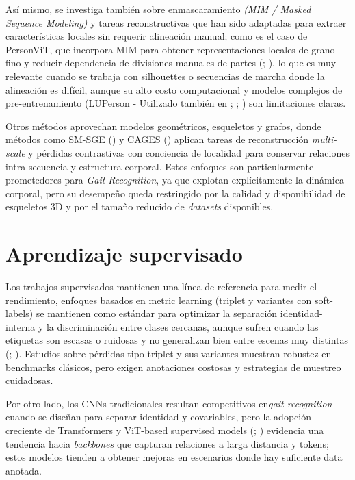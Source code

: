 Así mismo, se investiga también sobre enmascaramiento \textit{(MIM / Masked Sequence Modeling)} y tareas reconstructivas que han sido adaptadas para extraer características locales sin requerir alineación manual; como es el caso de PersonViT, que incorpora MIM para obtener representaciones locales de grano fino y reducir dependencia de divisiones manuales de partes (\cite{Han2021LocalitySGE}; \cite{Wang2025GaitForeMer}), lo que es muy relevante cuando se trabaja con silhouettes o secuencias de marcha donde la alineación es difícil, aunque su alto costo computacional y modelos complejos de pre-entrenamiento (LUPerson - Utilizado también en \cite{Zheng2022PASS}; \cite{Li2025OrientedKD}; \cite{Xu2023VILLS}) son limitaciones claras.

Otros métodos aprovechan modelos geométricos, esqueletos y grafos, donde métodos como SM-SGE (\cite{Han2021SMSGE}) y CAGES (\cite{Han2021LocalitySGE}) aplican tareas de reconstrucción \textit{multi-scale} y pérdidas contrastivas con conciencia de localidad para conservar relaciones intra-secuencia y estructura corporal. Estos enfoques son particularmente prometedores para \textit{Gait Recognition}, ya que explotan explícitamente la dinámica corporal, pero su desempeño queda restringido por la calidad y disponibilidad de esqueletos 3D y por el tamaño reducido de \textit{datasets} disponibles.

\section{Aprendizaje supervisado}

Los trabajos supervisados mantienen una línea de referencia para medir el rendimiento, enfoques basados en metric learning (triplet y variantes con soft-labels) se mantienen como estándar para optimizar la separación identidad-interna y la discriminación entre clases cercanas, aunque sufren cuando las etiquetas son escasas o ruidosas y no generalizan bien entre escenas muy distintas (\cite{Lin2020Softened}; \cite{Guo2023TripletContrastive}). Estudios sobre pérdidas tipo triplet y sus variantes muestran robustez en benchmarks clásicos, pero exigen anotaciones costosas y estrategias de muestreo cuidadosas. 

Por otro lado, los CNNs tradicionales resultan competitivos en\textit{gait recognition} cuando se diseñan para separar identidad y covariables, pero la adopción creciente de Transformers y ViT-based supervised models (\cite{Huang2025PersonViT}; \cite{He2025TransReID}) evidencia una tendencia hacia \textit{backbones} que capturan relaciones a larga distancia y tokens; estos modelos tienden a obtener mejoras en escenarios donde hay suficiente data anotada.

